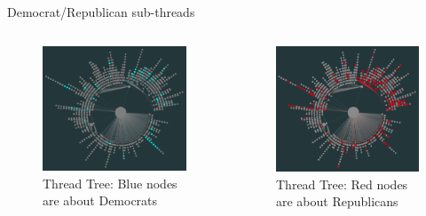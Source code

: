 \documentclass[aspectratio=169,notes]{beamer}
\begin{document}
\begin{frame}{Democrat/Republican sub-threads}
 \begin{columns}
  \begin{column}{.5\textwidth}
    \begin{figure}[htp]
    \centering
    \includegraphics[width=\linewidth]{graph_dem.png}
    \caption{Thread Tree: Blue nodes are about Democrats}
    \end{figure}
  \end{column}
  \begin{column}{.5\textwidth}
    \begin{figure}[htp]
    \centering
    \includegraphics[width=\linewidth]{graph_rep.png}
    \caption{Thread Tree: Red nodes are about Republicans}
    \end{figure}
  \end{column}
 \end{columns}
\end{frame}
\end{document}
